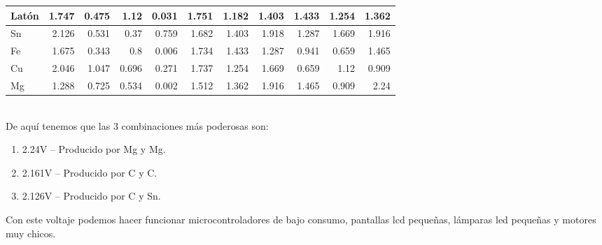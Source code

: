 \documentclass[article,12pt]{elsarticle}
\begin{document}
\begin{table}[h]
\begin{tabular}{|l|r|r|r|r|r|r|r|r|r|r|}
Latón    & 1.747                       & 0.475                       & 1.12                          & 0.031                       & 1.751                     & 1.182                      & 1.403                       & 1.433                       & 1.254                      & 1.362                         \\ \hline
\rowcolor[HTML]{D9D9D9} 
Sn   & 2.126                       & 0.531                       & 0.37                          & 0.759                       & 1.682                     & 1.403                      & 1.918                       & 1.287                       & 1.669                      & 1.916                         \\ \hline
Fe   & 1.675                       & 0.343                       & 0.8                           & 0.006                       & 1.734                     & 1.433                      & 1.287                       & 0.941                       & 0.659                      & 1.465                         \\ \hline
\rowcolor[HTML]{D9D9D9} 
Cu    & 2.046                       & 1.047                       & 0.696                         & 0.271                       & 1.737                     & 1.254                      & 1.669                       & 0.659                       & 1.12                       & 0.909                         \\ \hline
Mg & 1.288                       & 0.725                       & 0.534                         & 0.002                       & 1.512                     & 1.362                      & 1.916                       & 1.465                       & 0.909                      & 2.24                          \\ \hline
\end{tabular}
\end{table}\\

De aquí tenemos que las 3 combinaciones más poderosas son:
\begin{enumerate}
    \item 2.24V – Producido por Mg y Mg.
    \item 2.161V – Producido por C y C.
    \item 2.126V – Producido por C y Sn.
\end{enumerate}

Con este voltaje podemos hacer funcionar microcontroladores de bajo consumo, pantallas lcd pequeñas, lámparas led pequeñas y motores muy chicos.\\
\end{document}
